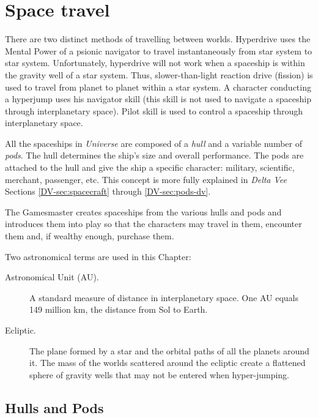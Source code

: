 \chapter{\hspace{5mm}Space travel}
\label{cha:space-travel}

There are two distinct methods of travelling between worlds.
Hyperdrive uses the Mental Power of a psionic navigator to travel
instantaneously from star system to star system. Unfortunately,
hyperdrive will not work when a spaceship is within the gravity well
of a star system. Thus, slower-than-light reaction drive (fission) is
used to travel from planet to planet within a star system. A character
conducting a hyperjump uses his navigator skill (this skill is not
used to navigate a spaceship through interplanetary space). Pilot
skill is used to control a spaceship through interplanetary space.

All the spaceships in \emph{Universe} are composed of a \emph{hull}
and a variable number of \emph{pods}. The hull determines the ship's
size and overall performance. The pods are attached to the hull and
give the ship a specific character: military, scientific, merchant,
passenger, etc. This concept is more fully explained in \emph{Delta
  Vee} Sections \ref{DV-sec:spacecraft} through \ref{DV-sec:pods-dv}.

The Gamesmaster creates spaceships from the various hulls and pods and
introduces them into play so that the characters may travel in them,
encounter them and, if wealthy enough, purchase them.

Two astronomical terms are used in this Chapter: 

\begin{description}
\item[Astronomical Unit (AU).] A standard measure of distance in
  interplanetary space. One AU equals 149 million km, the distance
  from Sol to Earth.
\item[Ecliptic.] The plane formed by a star and the orbital paths of
  all the planets around it. The mass of the worlds scattered around
  the ecliptic create a flattened sphere of gravity wells that may
  not be entered when hyper-jumping.
\end{description}

\section{Hulls and Pods}
\label{sec:hulls-pods}



